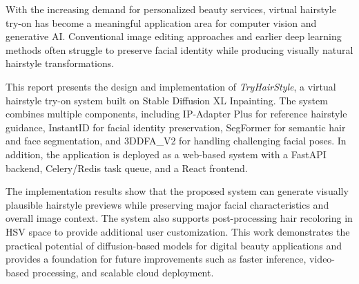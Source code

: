\documentclass[../main.tex]{subfiles}
\begin{document}
With the increasing demand for personalized beauty services, virtual hairstyle try-on has become a meaningful application area for computer vision and generative AI. Conventional image editing approaches and earlier deep learning methods often struggle to preserve facial identity while producing visually natural hairstyle transformations.

This report presents the design and implementation of \textit{TryHairStyle}, a virtual hairstyle try-on system built on Stable Diffusion XL Inpainting. The system combines multiple components, including IP-Adapter Plus for reference hairstyle guidance, InstantID for facial identity preservation, SegFormer for semantic hair and face segmentation, and 3DDFA\_V2 for handling challenging facial poses. In addition, the application is deployed as a web-based system with a FastAPI backend, Celery/Redis task queue, and a React frontend.

The implementation results show that the proposed system can generate visually plausible hairstyle previews while preserving major facial characteristics and overall image context. The system also supports post-processing hair recoloring in HSV space to provide additional user customization. This work demonstrates the practical potential of diffusion-based models for digital beauty applications and provides a foundation for future improvements such as faster inference, video-based processing, and scalable cloud deployment.
\end{document}
